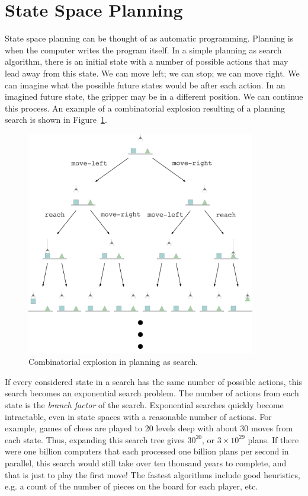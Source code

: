 \section{State Space Planning}

State space planning can be thought of as automatic programming.
Planning is when the computer writes the program itself.  In a simple
planning as search algorithm, there is an initial state with a number
of possible actions that may lead away from this state.  We can move
left; we can stop; we can move right.  We can imagine what the
possible future states would be after each action.  In an imagined
future state, the gripper may be in a different position.  We can
continue this process.  An example of a combinatorial explosion
resulting of a planning search is shown in
Figure~\ref{figure:combinatorial_explosion_example}.
\begin{figure}
\center
\includegraphics[width=10cm]{gfx/combinatorial_explosion_example}
\caption{Combinatorial explosion in planning as search.}
\label{figure:combinatorial_explosion_example}
\end{figure}

If every considered state in a search has the same number of possible
actions, this search becomes an exponential search problem.  The
number of actions from each state is the \emph{branch factor} of the
search.  Exponential searches quickly become intractable, even in
state spaces with a reasonable number of actions.  For example, games
of chess are played to 20 levels deep with about 30 moves from each
state.  Thus, expanding this search tree gives $30^{20}$, or $3 \times
10^{29}$ plans.  If there were one billion computers that each
processed one billion plans per second in parallel, this search would
still take over ten thousand years to complete, and that is just to
play the first move!  The fastest algorithms include good heuristics,
e.g. a count of the number of pieces on the board for each player,
etc.

